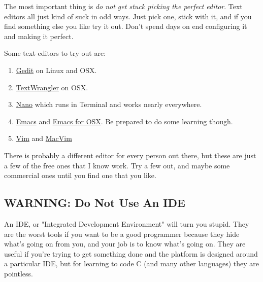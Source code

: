 The most important thing is \emph{do not get stuck picking the perfect editor}.
Text editors all just kind of suck in odd ways.  Just pick one, stick with it,
and if you find something else you like try it out.  Don't spend days
on end configuring it and making it perfect.

Some text editors to try out are:

\begin{enumerate}
\item \href{http://projects.gnome.org/gedit/}{Gedit} on Linux and OSX.
\item \href{http://www.barebones.com/products/textwrangler/}{TextWrangler} on OSX.
\item \href{http://www.nano-editor.org/}{Nano} which runs in Terminal and works nearly everywhere.
\item \href{http://www.gnu.org/software/emacs/}{Emacs} and \href{http://emacsformacosx.com/}{Emacs for OSX}.  Be prepared to do some learning though.
\item \href{http://www.vim.org/}{Vim} and \href{http://code.google.com/p/macvim/}{MacVim}
\end{enumerate}

There is probably a different editor for every person out there, but these are
just a few of the free ones that I know work.  Try a few out, and maybe some
commercial ones until you find one that you like.

\subsection{WARNING: Do Not Use An IDE}

An IDE, or "Integrated Development Environment" will turn you stupid.  They are
the worst tools if you want to be a good programmer because they hide what's
going on from you, and your job is to know what's going on.  They are useful
if you're trying to get something done and the platform is designed around 
a particular IDE, but for learning to code C (and many other languages) they
are pointless.

